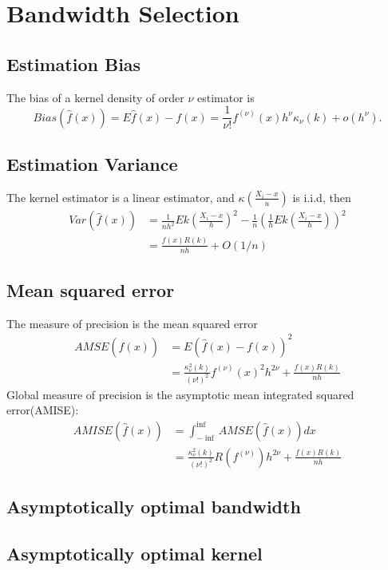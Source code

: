 \documentclass{article}
\begin{document}
\section{Bandwidth Selection}
\subsection{Estimation Bias}
The bias of a kernel density of order $\nu$ estimator is
\[ Bias(\hat{f}(x)) = E\hat{f}(x) - f(x) = \frac{1}{\nu!} f^{(\nu)}(x) h^{\nu} \kappa_{\nu} (k) + o(h^{\nu}). \]


\subsection{Estimation Variance}
The kernel estimator is a linear estimator, and $\kappa(\frac{X_i - x}{u})$ is i.i.d, then \[\begin{split} Var(\hat{f}(x)) & = \frac{1}{nh^2} E k \left( \frac{X_i - x}{h} \right)^2 - \frac{1}{n} \left( \frac{1}{h} Ek\left( \frac{X_i - x}{h} \right) \right)^2 \\
& = \frac{f(x)R(k)}{nh} + O(1/n)
\end{split}\]

\subsection{Mean squared error}
The measure of precision is the mean squared error
\[\begin{split}
AMSE(\hat{f}(x)) & = E(\hat{f}(x) - f(x))^2 \\
& = \frac{\kappa_\nu^2(k)}{(\nu!)^2} f^{(\nu)}(x)^2 h^{2\nu} + \frac{f(x)R(k)}{nh}
\end{split}\]
Global measure of precision is the asymptotic mean integrated squared error(AMISE):
\[\begin{split}
AMISE(\hat{f}(x)) & = \int_{-\inf}^{\inf} AMSE(\hat{f}(x)) dx \\
& = \frac{\kappa_\nu^2(k)}{(\nu!)^2} R( f^{(\nu)}) h^{2\nu} + \frac{f(x)R(k)}{nh}
\end{split}\]
\subsection{Asymptotically optimal bandwidth}

\subsection{Asymptotically optimal kernel}
\end{document}
